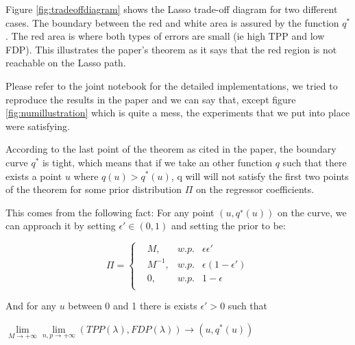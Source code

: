 \documentclass[10pt,onecolumn,letterpaper]{article}
\begin{document}
Figure \ref{fig:tradeoffdiagram} shows the Lasso trade-off diagram for two different cases. The boundary between the red and white area is assured by the function $q^*$. The red area is where both types of errors are small (ie high TPP and low FDP). This illustrates the paper's theorem as it says that the red region is not reachable on the Lasso path.


Please refer to the joint notebook for the detailed implementations, we tried to reproduce the results in the paper and we can say that, except figure \ref{fig:numillustration} which is quite a mess, the experiments that we put into place were satisfying.


According to the last point of the theorem as cited in the paper, the boundary curve $q^*$ is tight, which means that if we take an other function $q$ such that there exists a point $u$ where $q(u) > q^*(u)$, q will will not satisfy the first two points of the theorem for some prior distribution $\Pi$ on the regressor coefficients.
\newline

This comes from the following fact: For any point $\left(u,q^∗(u) \right)$ on the curve, we can approach it by setting $\epsilon \prime \in (0,1)$ and setting the prior to be:

\begin{equation}
   \Pi = 
   \left\{
       \begin{aligned}
         &M,      &w.p.&\epsilon \epsilon \prime \\
         &M^{-1}, &w.p.&\epsilon(1-\epsilon \prime)\\
         &0,      &w.p.& 1 - \epsilon \\
       \end{aligned}
     \right.
 \end{equation}
\newline

And for any $u$ between 0 and 1 there is exists $\epsilon \prime > 0 $  such that

\begin{center}
$\lim\limits_{M \rightarrow +\infty} \lim\limits_{n,p \rightarrow +\infty}  (TPP(\lambda), FDP(\lambda)) \rightarrow  (u,q^*(u))$
\end{center}
\end{document}
